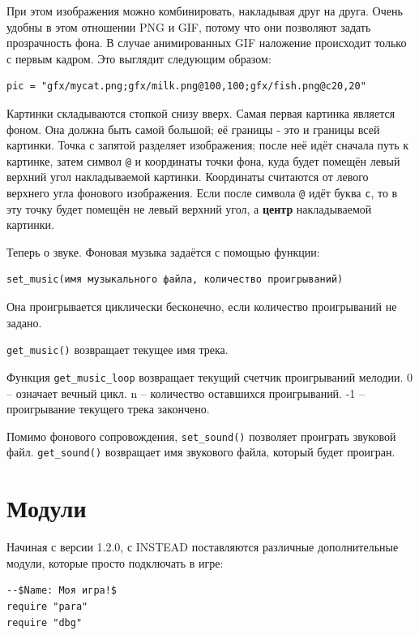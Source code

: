 \documentclass[a4paper,12pt]{article}
\begin{document}
При этом изображения можно комбинировать, накладывая друг на друга. Очень удобны в этом отношении PNG и GIF, потому что они позволяют задать прозрачность фона.
В случае анимированных GIF наложение происходит только с первым кадром.
Это выглядит следующим образом:

\begin{verbatim}
pic = "gfx/mycat.png;gfx/milk.png@100,100;gfx/fish.png@c20,20"
\end{verbatim}

Картинки складываются стопкой снизу вверх. Самая первая картинка является фоном. Она должна быть самой большой; её границы - это и границы всей картинки.
Точка с запятой разделяет изображения; после неё идёт сначала путь к картинке, затем символ \verb/@/ и координаты точки фона, куда будет помещён левый верхний угол накладываемой картинки.
Координаты считаются от левого верхнего угла фонового изображения. Если после символа \verb/@/ идёт буква \verb/c/, то в эту точку будет помещён не левый верхний угол, а \textbf{центр} накладываемой картинки.

Теперь о звуке. Фоновая музыка задаётся с помощью функции:

\begin{verbatim}
set_music(имя музыкального файла, количество проигрываний)
\end{verbatim}

Она проигрывается циклически бесконечно, если количество проигрываний не задано.

 \verb/get_music()/ возвращает текущее имя трека.

 Функция \verb/get_music_loop/ возвращает текущий счетчик проигрываний мелодии. 0 -- означает вечный цикл. n -- количество оставшихся проигрываний. -1 -- проигрывание текущего трека закончено.

Помимо фонового сопровождения, \verb/set_sound()/ позволяет проиграть звуковой файл. \verb/get_sound()/ возвращает имя звукового файла, который будет проигран.

\section{Модули}
Начиная с версии 1.2.0, с INSTEAD поставляются различные дополнительные модули, которые просто подключать в игре:

\begin{verbatim}
--$Name: Моя игра!$
require "para"
require "dbg"
\end{verbatim}
\end{document}
